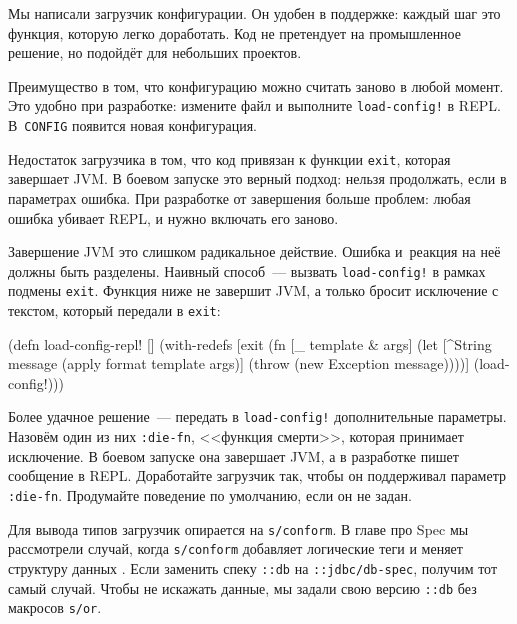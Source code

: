 Мы написали загрузчик конфигурации. Он удобен в поддержке: каждый шаг это
функция, которую легко доработать. Код не претендует на промышленное решение, но
подойдёт для небольших проектов.

Преимущество в том, что конфигурацию можно считать заново в любой момент. Это
удобно при разработке: измените файл и выполните \verb|load-config!| в
REPL. В~\verb|CONFIG| появится новая конфигурация.


Недостаток загрузчика в том, что код привязан к функции \verb|exit|, которая
завершает JVM. В боевом запуске это верный подход: нельзя продолжать, если в
параметрах ошибка. При разработке от завершения больше проблем: любая ошибка
убивает REPL, и нужно включать его заново.

Завершение JVM это слишком радикальное действие. Ошибка и~реакция на неё
должны быть разделены. Наивный способ~--- вызвать \verb|load-config!| в рамках
подмены \verb|exit|. Функция ниже не завершит JVM, а только бросит исключение
с текстом, который передали в \verb|exit|:

\begin{english}
  \begin{clojure}
(defn load-config-repl! []
  (with-redefs
    [exit (fn [_ template & args]
            (let [^String message
                  (apply format template args)]
              (throw (new Exception message))))]
    (load-config!)))
  \end{clojure}
\end{english}


Более удачное решение~--- передать в \verb|load-config!| дополнительные
параметры. Назовём один из них \verb|:die-fn|, <<функция смерти>>, которая
принимает исключение. В боевом запуске она завершает JVM, а в разработке пишет
сообщение в REPL. Доработайте загрузчик так, чтобы он поддерживал параметр
\verb|:die-fn|. Продумайте поведение по умолчанию, если он не задан.

Для вывода типов загрузчик опирается на \verb|s/conform|. В главе про Spec мы
рассмотрели случай, когда \verb|s/conform| добавляет логические теги и меняет
структуру данных . Если заменить спеку \verb|::db| на
\verb|::jdbc/db-spec|, получим тот самый случай. Чтобы не искажать данные, мы
задали свою версию \verb|::db| без макросов \verb|s/or|.


